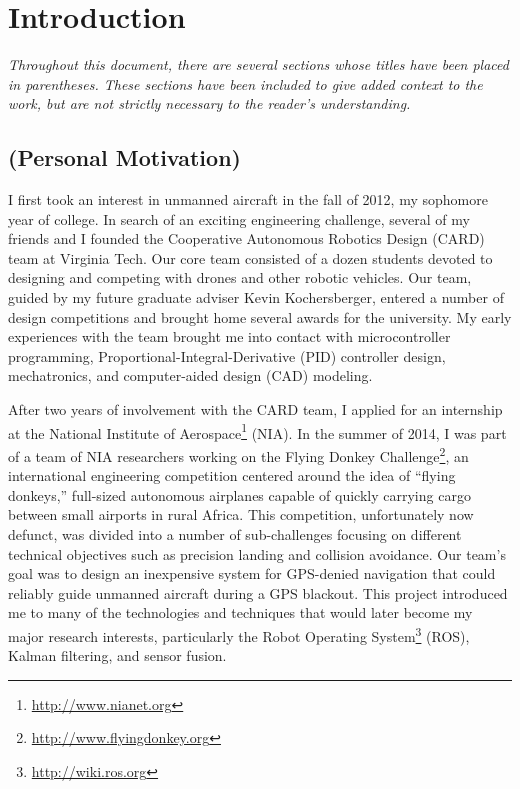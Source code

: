 \chapter{Introduction}


\textit{Throughout this document, there are several sections whose titles have been placed in parentheses. These sections have been included to give added context to the work, but are not strictly necessary to the reader's understanding.}

\section{(Personal Motivation)}

I first took an interest in unmanned aircraft in the fall of 2012, my sophomore year of college. In search of an exciting engineering challenge, several of my friends and I founded the Cooperative Autonomous Robotics Design (CARD) team at Virginia Tech. Our core team consisted of a dozen students devoted to designing and competing with drones and other robotic vehicles. Our team, guided by my future graduate adviser Kevin Kochersberger, entered a number of design competitions and brought home several awards for the university. My early experiences with the team brought me into contact with microcontroller programming, Proportional-Integral-Derivative (PID) controller design, mechatronics, and computer-aided design (CAD) modeling.

After two years of involvement with the CARD team, I applied for an internship at the National Institute of Aerospace\footnote{\url{http://www.nianet.org}} (NIA). In the summer of 2014, I was part of a team of NIA researchers working on the Flying Donkey Challenge\footnote{\url{http://www.flyingdonkey.org}}, an international engineering competition centered around the idea of ``flying donkeys,'' full-sized autonomous airplanes capable of quickly carrying cargo between small airports in rural Africa. This competition, unfortunately now defunct, was divided into a number of sub-challenges focusing on different technical objectives such as precision landing and collision avoidance. Our team's goal was to design an inexpensive system for GPS-denied navigation that could reliably guide unmanned aircraft during a GPS blackout. This project introduced me to many of the technologies and techniques that would later become my major research interests, particularly the Robot Operating System\footnote{\url{http://wiki.ros.org}} (ROS), Kalman filtering, and sensor fusion.


